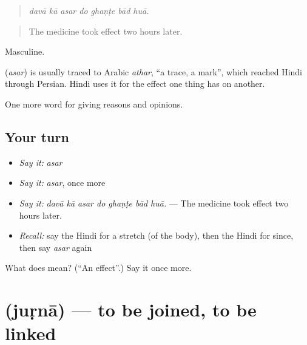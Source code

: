 \begin{quote}
      
\end{quote}

\begin{quote}
\emph{davā kā asar do ghaṇṭe bād huā.}
\end{quote}

\begin{quote}
The medicine took effect two hours later.
\end{quote}

Masculine.

\begin{cousinweb}
\textbf{} (\emph{asar}) is usually traced to Arabic \emph{athar}, \textquotedblleft{}a trace, a mark\textquotedblright{}, which reached Hindi through Persian. Hindi uses it for the effect one thing has on another.
\end{cousinweb}

\begin{grammarlens}[title={What you've built}]
One more word for giving reasons and opinions.
\end{grammarlens}

\subsection*{Your turn}
\begin{itemize}
\raggedright
  \item \emph{Say it:} \emph{asar}
  \item \emph{Say it:} \emph{asar}, once more
  \item \emph{Say it:} \emph{davā kā asar do ghaṇṭe bād huā.} — The medicine took effect two hours later.
  \item \emph{Recall:} say the Hindi for a stretch (of the body), then the Hindi for since, then say \emph{asar} again
\end{itemize}

\begin{tcolorbox}[breakable,colback=teal!4,colframe=teal!35!black,title={Before you move on}]
What does  mean? (\textquotedblleft{}An effect\textquotedblright{}.) Say it once more.
\end{tcolorbox}
\section[\texorpdfstring{\hi{जुड़ना} (juṛnā)}{जुड़ना (juṛnā)}]{ (juṛnā) — to be joined, to be linked}

